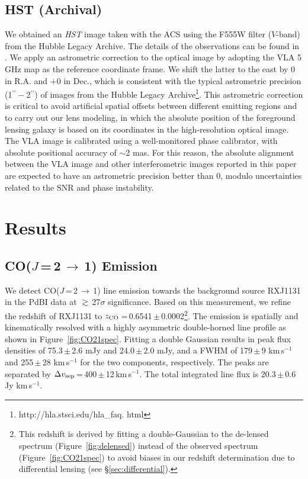 \documentclass[]{emulateapj}
\newcommand{\rarr}{$\rightarrow$}
\newcommand{\bco}{\mbox{CO($J$\,=\,2\,\rarr\,1)}\xspace}
\newcommand{\kms}{\mbox{km\,s$^{-1}$}\xspace}
\newcommand{\eq}{\,=\,}
\newcommand{\pmm}{\,$\pm$\,}
\newcommand{\Fig}[1]{Figure~\ref{fig:#1}}
\newcommand{\Sec}[1]{\S\ref{sec:#1}}
\begin{document}
\subsection{HST (Archival)}
We obtained an {\it HST} image taken with
the ACS
using the F555W filter ($V$-band)
from the
Hubble Legacy Archive.
The details of the observations can be found
in .
We apply an astrometric correction to the optical image by adopting the VLA 5\,GHz map as the
reference coordinate frame.
We shift the latter to the east by 0 in R.A. and $+$0 in
Dec., which is consistent with the typical astrometric precision (1$^{\prime\prime}-$2$^{\prime\prime}$) of
images from the Hubble Legacy Archive\footnote{http://hla.stsci.edu/hla\_faq.
html}. This astrometric correction is critical to avoid artificial spatial
offsets between different emitting regions and to carry out our lens modeling,
in which the absolute position of the foreground lensing galaxy is based on
its coordinates in the high-resolution optical image.
The VLA image is calibrated using a well-monitored phase
calibrator, with absolute positional accuracy of $\sim$2 mas.
For this reason, the absolute alignment between the VLA image and other
interferometric images reported in this paper are expected to have an astrometric
precision better than 0, modulo uncertainties related to the SNR and phase
instability.

\section{Results} \label{sec:results}
\subsection{\bco Emission} \label{sec:CO21}
We detect \bco line emission towards the background source RXJ1131 in the PdBI data
at $\gtrsim$\,27$\sigma$ significance. Based on this measurement, we refine the redshift of RXJ1131 to
$z_{\rm CO}$\eq0.6541\,$\pm$\,0.0002\footnote{This redshift is derived by fitting a double-Gaussian to
the de-lensed spectrum (\Fig{delensed})
instead of the observed spectrum (\Fig{CO21spec}) to avoid biases in our
redshift determination
due to differential lensing (see \Sec{differential}).
}. The emission is spatially and kinematically resolved
with a highly asymmetric double-horned line profile
as shown in \Fig{CO21spec}. Fitting a double Gaussian results in peak
flux densities of 75.3\pmm2.6 mJy and 24.0\pmm2.0 mJy, and a FWHM of
179\pmm9 \kms and 255\pmm28 \kms for the two components, respectively. The peaks are separated by
$\Delta v_{\rm sep}$\eq400\pmm12\,\kms. The total integrated line flux is 20.3\,$\pm$\,0.6 Jy \kms.
\end{document}
